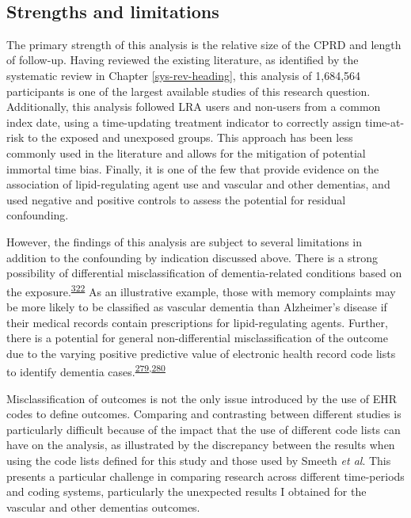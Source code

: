 \documentclass[a4paper, twoside]{templates/ociamthesis}
\begin{document}
~

\hypertarget{cprd-limitations}{%
\subsection{Strengths and limitations}\label{cprd-limitations}}

The primary strength of this analysis is the relative size of the CPRD and length of follow-up. Having reviewed the existing literature, as identified by the systematic review in Chapter \ref{sys-rev-heading}, this analysis of 1,684,564 participants is one of the largest available studies of this research question. Additionally, this analysis followed LRA users and non-users from a common index date, using a time-updating treatment indicator to correctly assign time-at-risk to the exposed and unexposed groups. This approach has been less commonly used in the literature and allows for the mitigation of potential immortal time bias. Finally, it is one of the few that provide evidence on the association of lipid-regulating agent use and vascular and other dementias, and used negative and positive controls to assess the potential for residual confounding.

However, the findings of this analysis are subject to several limitations in addition to the confounding by indication discussed above. There is a strong possibility of differential misclassification of dementia-related conditions based on the exposure.\textsuperscript{\protect\hyperlink{ref-porta2014}{322}} As an illustrative example, those with memory complaints may be more likely to be classified as vascular dementia than Alzheimer's disease if their medical records contain prescriptions for lipid-regulating agents. Further, there is a potential for general non-differential misclassification of the outcome due to the varying positive predictive value of electronic health record code lists to identify dementia cases.\textsuperscript{\protect\hyperlink{ref-mcguinness2019validity}{279},\protect\hyperlink{ref-wilkinson2018}{280}}

Misclassification of outcomes is not the only issue introduced by the use of EHR codes to define outcomes. Comparing and contrasting between different studies is particularly difficult because of the impact that the use of different code lists can have on the analysis, as illustrated by the discrepancy between the results when using the code lists defined for this study and those used by Smeeth \emph{et al}. This presents a particular challenge in comparing research across different time-periods and coding systems, particularly the unexpected results I obtained for the vascular and other dementias outcomes.
\end{document}
